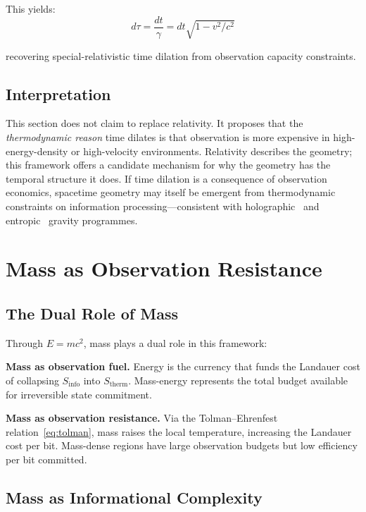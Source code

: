 \documentclass[12pt,a4paper]{article}
\begin{document}
This yields:
\begin{equation}
    d\tau = \frac{dt}{\gamma} = dt\sqrt{1 - v^2/c^2}
    \label{eq:sr_dilation}
\end{equation}

recovering special-relativistic time dilation from observation capacity constraints.

\subsection{Interpretation}

This section does not claim to replace relativity. It proposes that the \emph{thermodynamic reason} time dilates is that observation is more expensive in high-energy-density or high-velocity environments. Relativity describes the geometry; this framework offers a candidate mechanism for why the geometry has the temporal structure it does. If time dilation is a consequence of observation economics, spacetime geometry may itself be emergent from thermodynamic constraints on information processing---consistent with holographic~\cite{tHooft1993,Susskind1995} and entropic~\cite{Verlinde2011} gravity programmes.

\section{Mass as Observation Resistance}
\label{sec:mass}

\subsection{The Dual Role of Mass}

Through $E = mc^2$, mass plays a dual role in this framework:

\textbf{Mass as observation fuel.} Energy is the currency that funds the Landauer cost of collapsing $S_{\mathrm{info}}$ into $S_{\mathrm{therm}}$. Mass-energy represents the total budget available for irreversible state commitment.

\textbf{Mass as observation resistance.} Via the Tolman--Ehrenfest relation~\eqref{eq:tolman}, mass raises the local temperature, increasing the Landauer cost per bit. Mass-dense regions have large observation budgets but low efficiency per bit committed.

\subsection{Mass as Informational Complexity}
\end{document}
